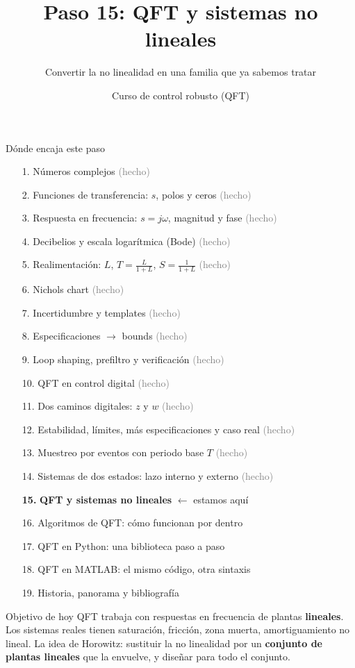 \documentclass[aspectratio=169,11pt]{beamer}
\title[QFT y no linealidades]{Paso 15: QFT y sistemas no lineales}
\subtitle{Convertir la no linealidad en una familia que ya sabemos tratar}
\author{Curso de control robusto (QFT)}
\date{}
\begin{document}
\begin{frame}\titlepage\end{frame}

\begin{frame}{Dónde encaja este paso}
  \tiny
  \begin{enumerate}\setlength{\itemsep}{-2pt}
    \item[1.] Números complejos \hfill \textcolor{gray}{(hecho)}
    \item[2.] Funciones de transferencia: $s$, polos y ceros \hfill \textcolor{gray}{(hecho)}
    \item[3.] Respuesta en frecuencia: $s=j\omega$, magnitud y fase \hfill \textcolor{gray}{(hecho)}
    \item[4.] Decibelios y escala logarítmica (Bode) \hfill \textcolor{gray}{(hecho)}
    \item[5.] Realimentación: $L$, $T=\frac{L}{1+L}$, $S=\frac{1}{1+L}$ \hfill \textcolor{gray}{(hecho)}
    \item[6.] Nichols chart \hfill \textcolor{gray}{(hecho)}
    \item[7.] Incertidumbre y templates \hfill \textcolor{gray}{(hecho)}
    \item[8.] Especificaciones $\rightarrow$ bounds \hfill \textcolor{gray}{(hecho)}
    \item[9.] Loop shaping, prefiltro y verificación \hfill \textcolor{gray}{(hecho)}
    \item[10.] QFT en control digital \hfill \textcolor{gray}{(hecho)}
    \item[11.] Dos caminos digitales: $z$ y $w$ \hfill \textcolor{gray}{(hecho)}
    \item[12.] Estabilidad, límites, más especificaciones y caso real \hfill \textcolor{gray}{(hecho)}
    \item[13.] Muestreo por eventos con periodo base $T$ \hfill \textcolor{gray}{(hecho)}
    \item[14.] Sistemas de dos estados: lazo interno y externo \hfill \textcolor{gray}{(hecho)}
    \item[\textbf{15.}] \textbf{QFT y sistemas no lineales} \hfill $\leftarrow$ estamos aquí
    \item[16.] Algoritmos de QFT: cómo funcionan por dentro
    \item[17.] QFT en Python: una biblioteca paso a paso
    \item[18.] QFT en MATLAB: el mismo código, otra sintaxis
    \item[19.] Historia, panorama y bibliografía
  \end{enumerate}
  \vspace{2pt}
  \begin{block}{Objetivo de hoy}
    QFT trabaja con respuestas en frecuencia de plantas \textbf{lineales}. Los sistemas reales tienen saturación, fricción, zona muerta, amortiguamiento no lineal. La idea de Horowitz: sustituir la no linealidad por un \textbf{conjunto de plantas lineales} que la envuelve, y diseñar para todo el conjunto.
  \end{block}
\end{frame}
\end{document}
